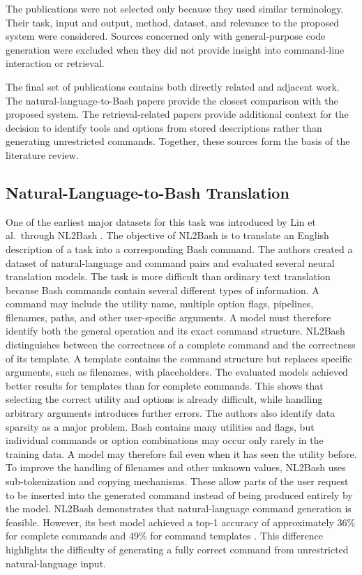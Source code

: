 The publications were not selected only because they used similar terminology. Their task,
input and output, method, dataset, and relevance to the proposed system were considered.
Sources concerned only with general-purpose code generation were excluded when they did not provide insight into command-line interaction or retrieval.

The final set of publications contains both directly related and adjacent work. The
natural-language-to-Bash papers provide the closest comparison with the proposed system.
The retrieval-related papers provide additional context for the decision to identify tools and options from stored descriptions rather than generating unrestricted commands. Together, these sources form the basis of the literature review.

\subsection{Natural-Language-to-Bash Translation}
One of the earliest major datasets for this task was introduced by Lin et al.\ through NL2Bash \cite{lin2018nl2bash}. The objective of NL2Bash is to translate an English description of a task into a corresponding Bash command. The authors created a dataset of natural-language and command pairs and evaluated several neural translation models.
The task is more difficult than ordinary text translation because Bash commands contain several different types of information. A command may include the utility name, multiple option flags, pipelines, filenames, paths, and other user-specific arguments. A model must therefore identify both the general operation and its exact command structure.
NL2Bash distinguishes between the correctness of a complete command and the correctness of its template. A template contains the command structure but replaces specific arguments, such as filenames, with placeholders. The evaluated models achieved better results for templates than for complete commands. This shows that selecting the correct utility and options is already difficult, while handling arbitrary arguments introduces further errors. The authors also identify data sparsity as a major problem. Bash contains many utilities and flags, but individual commands or option combinations may occur only rarely in the training data. A model may therefore fail even when it has seen the utility before. To improve the handling of filenames and other unknown values, NL2Bash uses sub-tokenization and copying mechanisms. These allow parts of the user request to be inserted into the generated command instead of being produced entirely by the model.
NL2Bash demonstrates that natural-language command generation is feasible. However, its best model achieved a top-1 accuracy of approximately 36\% for complete commands and 49\% for command templates \cite{lin2018nl2bash}. This difference highlights the difficulty of generating a fully correct command from unrestricted natural-language input.

